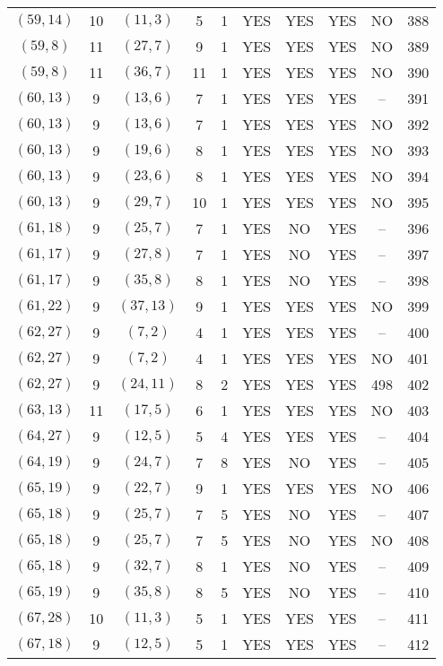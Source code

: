 \begin{longtable}{|c|c|c|c|c|c|c|c|c|c|}
$(59, 14)$ & 10 & $(11, 3)$ & 5 & 1 & YES & YES & YES & NO & 388\\
$(59, 8)$ & 11 & $(27, 7)$ & 9 & 1 & YES & YES & YES & NO & 389\\
$(59, 8)$ & 11 & $(36, 7)$ & 11 & 1 & YES & YES & YES & NO & 390\\
$(60, 13)$ & 9 & $(13, 6)$ & 7 & 1 & YES & YES & YES & -- & 391\\
$(60, 13)$ & 9 & $(13, 6)$ & 7 & 1 & YES & YES & YES & NO & 392\\
$(60, 13)$ & 9 & $(19, 6)$ & 8 & 1 & YES & YES & YES & NO & 393\\
$(60, 13)$ & 9 & $(23, 6)$ & 8 & 1 & YES & YES & YES & NO & 394\\
$(60, 13)$ & 9 & $(29, 7)$ & 10 & 1 & YES & YES & YES & NO & 395\\
$(61, 18)$ & 9 & $(25, 7)$ & 7 & 1 & YES & NO & YES & -- & 396\\
$(61, 17)$ & 9 & $(27, 8)$ & 7 & 1 & YES & NO & YES & -- & 397\\
$(61, 17)$ & 9 & $(35, 8)$ & 8 & 1 & YES & NO & YES & -- & 398\\
$(61, 22)$ & 9 & $(37, 13)$ & 9 & 1 & YES & YES & YES & NO & 399\\
$(62, 27)$ & 9 & $(7, 2)$ & 4 & 1 & YES & YES & YES & -- & 400\\
$(62, 27)$ & 9 & $(7, 2)$ & 4 & 1 & YES & YES & YES & NO & 401\\
$(62, 27)$ & 9 & $(24, 11)$ & 8 & 2 & YES & YES & YES & 498 & 402\\
$(63, 13)$ & 11 & $(17, 5)$ & 6 & 1 & YES & YES & YES & NO & 403\\
$(64, 27)$ & 9 & $(12, 5)$ & 5 & 4 & YES & YES & YES & -- & 404\\
$(64, 19)$ & 9 & $(24, 7)$ & 7 & 8 & YES & NO & YES & -- & 405\\
$(65, 19)$ & 9 & $(22, 7)$ & 9 & 1 & YES & YES & YES & NO & 406\\
$(65, 18)$ & 9 & $(25, 7)$ & 7 & 5 & YES & NO & YES & -- & 407\\
$(65, 18)$ & 9 & $(25, 7)$ & 7 & 5 & YES & NO & YES & NO & 408\\
$(65, 18)$ & 9 & $(32, 7)$ & 8 & 1 & YES & NO & YES & -- & 409\\
$(65, 19)$ & 9 & $(35, 8)$ & 8 & 5 & YES & NO & YES & -- & 410\\
$(67, 28)$ & 10 & $(11, 3)$ & 5 & 1 & YES & YES & YES & -- & 411\\
$(67, 18)$ & 9 & $(12, 5)$ & 5 & 1 & YES & YES & YES & -- & 412\\

\end{longtable}
